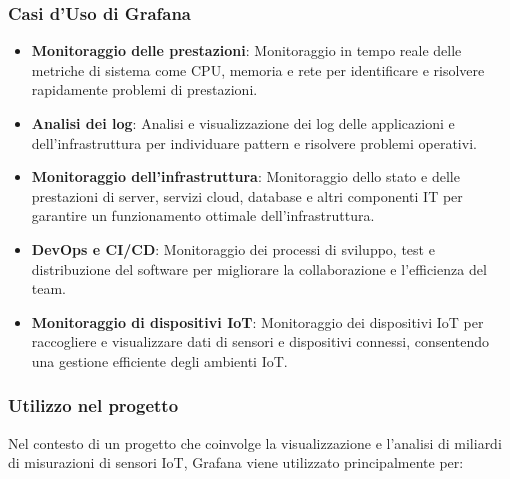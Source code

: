 \subsubsection{Casi d'Uso di Grafana}
\begin{itemize}
    \item \textbf{Monitoraggio delle prestazioni}: Monitoraggio in tempo reale delle metriche di sistema come CPU, memoria e rete per identificare e risolvere rapidamente problemi di prestazioni.
    
    \item \textbf{Analisi dei log}: Analisi e visualizzazione dei log delle applicazioni e dell'infrastruttura per individuare pattern e risolvere problemi operativi.
    
    \item \textbf{Monitoraggio dell'infrastruttura}: Monitoraggio dello stato e delle prestazioni di server, servizi cloud, database e altri componenti IT per garantire un funzionamento ottimale dell'infrastruttura.
    
    \item \textbf{DevOps e CI/CD}: Monitoraggio dei processi di sviluppo, test e distribuzione del software per migliorare la collaborazione e l'efficienza del team.
    
    \item \textbf{Monitoraggio di dispositivi IoT}: Monitoraggio dei dispositivi IoT per raccogliere e visualizzare dati di sensori e dispositivi connessi, consentendo una gestione efficiente degli ambienti IoT.
\end{itemize}
\subsubsection{Utilizzo nel progetto}
Nel contesto di un progetto che coinvolge la visualizzazione e l'analisi di miliardi di misurazioni di sensori IoT, Grafana viene utilizzato principalmente per:

